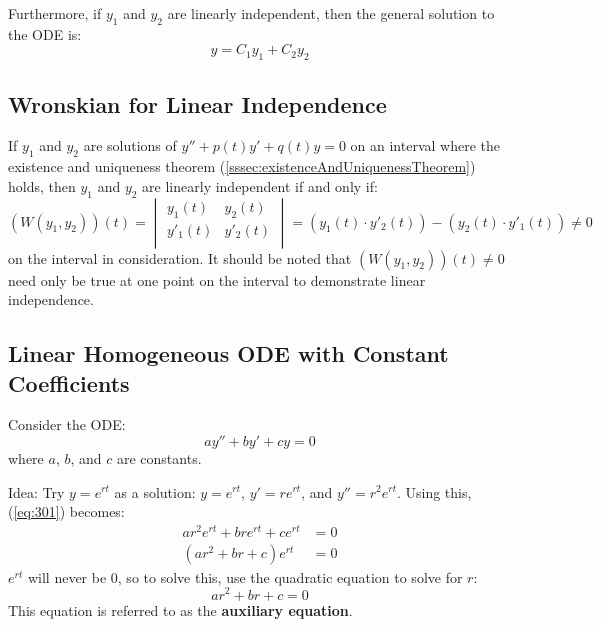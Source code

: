 \documentclass[12pt]{article}
\begin{document}
Furthermore, if $y_1$ and $y_2$ are linearly independent, then the general solution to the ODE is:
\begin{equation*}
  y = C_1y_1 + C_2y_2
\end{equation*}

\subsection{Wronskian for Linear Independence}
\label{ssec:wronskianForLinearIndependence}

If $y_1$ and $y_2$ are solutions of $y'' + p(t)y' + q(t)y = 0$ on an interval where the existence and uniqueness theorem (\ref{sssec:existenceAndUniquenessTheorem}) holds, then $y_1$ and $y_2$ are linearly independent if and only if:
\begin{equation*}
  \left(W(y_1,y_2)\right)(t) = 
  \begin{vmatrix}
    y_1(t)  & y_2(t) \\
    y'_1(t) & y'_2(t) \\
  \end{vmatrix} = 
    \left( y_1(t) \cdot y'_2(t) \right) - \left( y_2(t) \cdot y'_1(t) \right) \neq 0
\end{equation*}
on the interval in consideration. It should be noted that $\left(W(y_1,y_2)\right)(t) \neq 0$ need only be true at one point on the interval to demonstrate linear independence.

\subsection{Linear Homogeneous ODE with Constant Coefficients}
\label{ssec:linearHomogeneousODEWithConstantCoefficients}

Consider the ODE:
\begin{equation}
  ay'' + by' + cy = 0
  \label{eq:301}
\end{equation}
where $a$, $b$, and $c$ are constants.

Idea: Try $y=e^{rt}$ as a solution: $y=e^{rt}$, $y'=re^{rt}$, and $y''=r^2e^{rt}$. Using this, (\ref{eq:301}) becomes:
\begin{align*}
  ar^2e^{rt} + bre^{rt} + ce^{rt} &= 0 \\
  \left(ar^2 + br + c \right) e^{rt} &= 0
\end{align*}
$e^{rt}$ will never be $0$, so to solve this, use the quadratic equation to solve for $r$:
\begin{equation*}
  ar^2 + br + c = 0
\end{equation*}
This equation is referred to as the \textbf{auxiliary equation}.
\end{document}
